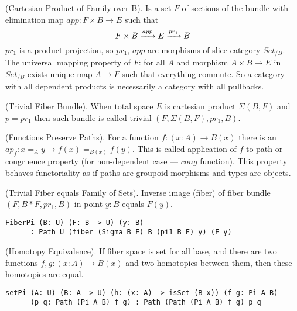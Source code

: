 \begin{definition} (Cartesian Product of Family over B).
Is a set $F$ of sections of the bundle with elimination map $app : F \times B \rightarrow E$ such that
\begin{equation}
F \times B \xrightarrow{{app}} E \xrightarrow{{pr_1}} B
\end{equation}
$pr_1$ is a product projection, so $pr_1$, $app$ are morphisms
of slice category $Set_{/B}$. The universal mapping property of $F$:
for all $A$ and morphism $A \times B \rightarrow E$ in $Set_{/B}$ exists
unique map $A \rightarrow F$ such that everything commute. So a category
with all dependent products is necessarily a category with all pullbacks.
\end{definition}

\begin{definition} (Trivial Fiber Bundle).
When total space $E$ is cartesian product $\Sigma(B,F)$ and $p = pr_1$
then such bundle is called trivial $(F,\Sigma(B,F),pr_1,B)$.
\end{definition}

\begin{theorem} (Functions Preserve Paths).
For a function $f: (x:A) \rightarrow B(x)$
there is an $ap_f : x =_A y \rightarrow f(x) =_{B(x)} f(y)$. This is called
application of $f$ to path or congruence property (for non-dependent case ---
$cong$ function). This property behaves functoriality
as if paths are groupoid morphisms and types are objects.
\end{theorem}

\begin{theorem} (Trivial Fiber equals Family of Sets).
Inverse image (fiber) of fiber bundle $(F,B*F,pr_1,B)$ in point $y:B$ equals $F(y)$.
\begin{lstlisting}
FiberPi (B: U) (F: B -> U) (y: B)
      : Path U (fiber (Sigma B F) B (pi1 B F) y) (F y)
\end{lstlisting}
\end{theorem}

\begin{theorem} (Homotopy Equivalence).
If fiber space is set for all base, and
there are two functions $f,g : (x:A) \rightarrow B(x)$ and two
homotopies between them, then these homotopies are equal.
\begin{lstlisting}
setPi (A: U) (B: A -> U) (h: (x: A) -> isSet (B x)) (f g: Pi A B)
      (p q: Path (Pi A B) f g) : Path (Path (Pi A B) f g) p q
\end{lstlisting}
\end{theorem}

